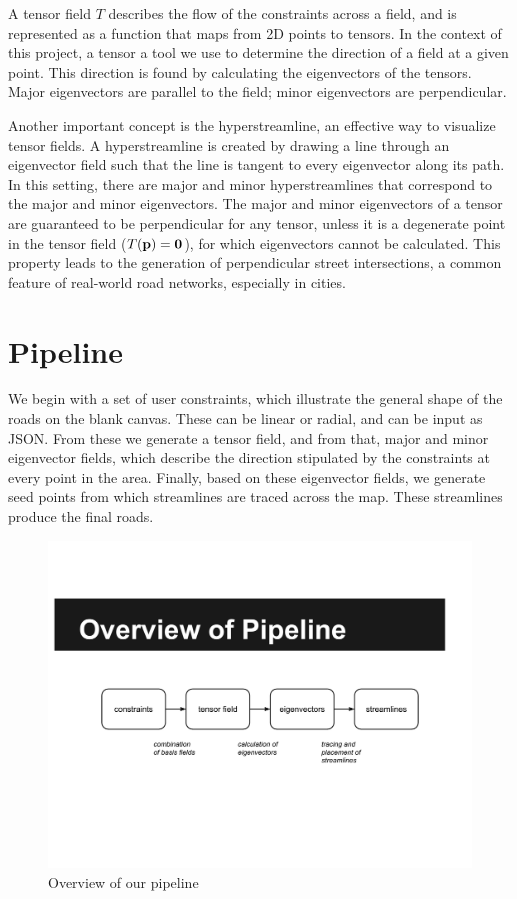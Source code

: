 \documentclass[twocolumn]{article}
\begin{document}
A tensor field $T$ describes the flow of the constraints across a field, and is
represented as a function that maps from 2D points to tensors. In the context
of this project, a tensor a tool we use to determine the direction of a field
at a given point. This direction is found by calculating the eigenvectors of
the tensors. Major eigenvectors are parallel to the field; minor eigenvectors
are perpendicular.

Another important concept is the hyperstreamline, an effective way to visualize
tensor fields. A hyperstreamline is created by drawing a line through an
eigenvector field such that the line is tangent to every eigenvector along its
path. In this setting, there are major and minor hyperstreamlines that
correspond to the major and minor eigenvectors. The major and minor
eigenvectors of a tensor are guaranteed to be perpendicular for any tensor,
unless it is a degenerate point in the tensor field ($T(\bf p)=0$), for which
eigenvectors cannot be calculated. This property leads to the generation of
perpendicular street intersections, a common feature of real-world road
networks, especially in cities.

\section{Pipeline}
We begin with a set of user constraints, which illustrate the general shape of
the roads on the blank canvas. These can be linear or radial, and can be input
as JSON. From these we generate a tensor field, and from that, major and minor
eigenvector fields, which describe the direction stipulated by the constraints
at every point in the area. Finally, based on these eigenvector fields, we
generate seed points from which streamlines are traced across the map. These
streamlines produce the final roads.

\begin{figure}[t!]
\begin{center}
    \includegraphics[width=5.5in]{images/pipeline.pdf}
\end{center}
\caption{Overview of our pipeline}
\label{fig:pipeline}
\end{figure}
\end{document}
